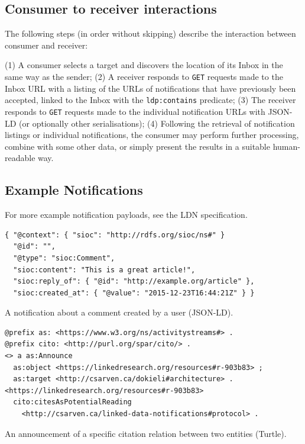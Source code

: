 \documentclass[a4paper]{llncs}
\begin{document}
                                \subsection{Consumer to receiver interactions}
  \label{consumer-to-receiver}



\par The following steps (in order without skipping) describe the interaction between consumer and receiver:


\par (1) A consumer selects a target and discovers the location of its Inbox in the same way as the sender; (2) A receiver responds to {\tt GET} requests made to the Inbox URL with a listing of the URLs of notifications that have previously been accepted, linked to the Inbox with the {\tt ldp:contains} predicate; (3) The receiver responds to {\tt GET} requests made to the individual notification URLs with JSON-LD (or optionally other serialisations); (4) Following the retrieval of notification listings or individual notifications, the consumer may perform further processing, combine with some other data, or simply present the results in a suitable human-readable way.




                                \subsection{Example Notifications}
  \label{example-notifications}



\par For more example notification payloads, see the \empty LDN specification.


\begin{lstlisting}
{ "@context": { "sioc": "http://rdfs.org/sioc/ns#" }
  "@id": "",
  "@type": "sioc:Comment",
  "sioc:content": "This is a great article!",
  "sioc:reply_of": { "@id": "http://example.org/article" },
  "sioc:created_at": { "@value": "2015-12-23T16:44:21Z" } }
\end{lstlisting}
                                        A notification about a comment created by a user (JSON-LD).



\begin{lstlisting}
@prefix as: <https://www.w3.org/ns/activitystreams#> .
@prefix cito: <http://purl.org/spar/cito/> .
<> a as:Announce
  as:object <https://linkedresearch.org/resources#r-903b83> ;
  as:target <http://csarven.ca/dokieli#architecture> .
<https://linkedresearch.org/resources#r-903b83>
  cito:citesAsPotentialReading
    <http://csarven.ca/linked-data-notifications#protocol> .
\end{lstlisting}
                                        An announcement of a specific citation relation between two entities (Turtle).
\end{document}
